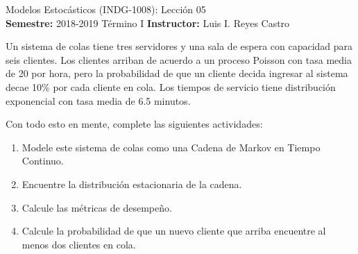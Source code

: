 \documentclass[ a4paper, twoside, 11pt]{article}
\newcommand{\numero}{05}
\begin{document}
\allowdisplaybreaks



\begin{center}
\Large Modelos Estoc\'asticos (INDG-1008): Lecci\'on \numero \\[1ex]
\small \textbf{Semestre:} 2018-2019 T\'ermino I \qquad
\textbf{Instructor:} Luis I. Reyes Castro
\end{center}
\fullskip

\begin{problem}
Un sistema de colas tiene tres servidores y una sala de espera con capacidad para seis clientes. Los clientes arriban de acuerdo a un proceso Poisson con tasa media de 20 por hora, pero la probabilidad de que un cliente decida ingresar al sistema decae 10\% por cada cliente en cola. Los tiempos de servicio tiene distribuci\'on exponencial con tasa media de 6.5 minutos. 

Con todo esto en mente, complete las siguientes actividades: 
\begin{enumerate}[label=\textbf{\alph*)}]
\item Modele este sistema de colas como una Cadena de Markov en Tiempo Continuo. 
\item Encuentre la distribuci\'on estacionaria de la cadena. 
\item Calcule las m\'etricas de desempe\~no. 
\item Calcule la probabilidad de que un nuevo cliente que arriba encuentre al menos dos clientes en cola. 
\end{enumerate}
\QED

\end{problem}
\fullskip
\end{document}
